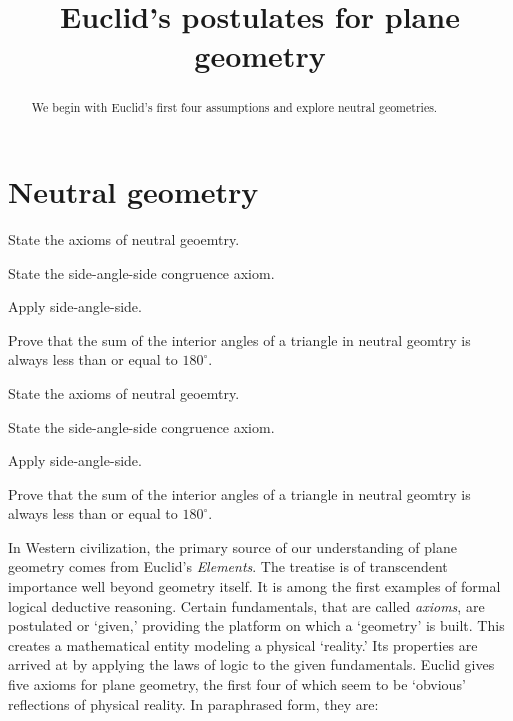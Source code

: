 \documentclass[instructornotes]{ximera}
\title{Euclid's postulates for plane geometry} %
\begin{document}
\begin{abstract}
We begin with Euclid's first four assumptions and explore neutral
geometries.
\end{abstract}
\maketitle




\section{Neutral geometry}

\begin{listOutcomes}
\item State the axioms of neutral geoemtry.
\item State the side-angle-side congruence axiom.
\item Apply side-angle-side.
\item Prove that the sum of the interior angles of a triangle in
  neutral geomtry is always less than or equal to $180^\circ$.
\end{listOutcomes}

\begin{listOutcomes}
\item State the axioms of neutral geoemtry.
\item State the side-angle-side congruence axiom.
\item Apply side-angle-side.
\item Prove that the sum of the interior angles of a triangle in
  neutral geomtry is always less than or equal to $180^\circ$.
\end{listOutcomes}



In Western civilization, the primary source of our understanding of
plane geometry comes from Euclid's \textit{Elements}. The treatise is
of transcendent importance well beyond geometry itself. It is among
the first examples of formal logical deductive reasoning. Certain
fundamentals, that are called \textit{axioms}, are postulated or
`given,' providing the platform on which a `geometry' is built. This
creates a mathematical entity modeling a physical `reality.' Its
properties are arrived at by applying the laws of logic to the given
fundamentals. Euclid gives five axioms for plane geometry, the first
four of which seem to be `obvious' reflections of physical reality. In
paraphrased form, they are:
\end{document}
